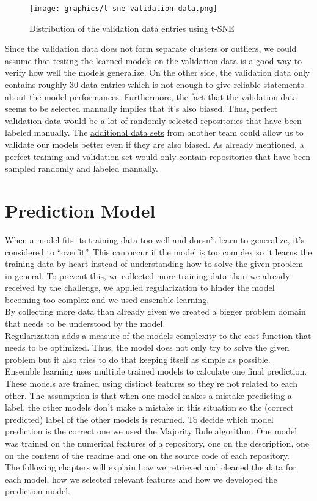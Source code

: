 \documentclass{article}
\begin{document}
\begin{figure}
	\centering
		\texttt{[image: graphics/t-sne-validation-data.png]}
	\caption{Distribution of the validation data entries using t-SNE}
	\label{t-sne-validation-data}
\end{figure}

Since the validation data does not form separate clusters or outliers,
we could assume that testing the learned models on the validation data
is a good way to verify how well the models generalize. On the other
side, the validation data only contains roughly 30 data entries which is
not enough to give reliable statements about the model performances.
Furthermore, the fact that the validation data seems to be selected
manually implies that it's also biased. Thus, perfect validation data
would be a lot of randomly selected repositories that have been labeled
manually. The
\href{https://github.com/InformatiCup/InformatiCup2017/tree/master/additional_data_sets}{additional
data sets} from another team could allow us to validate our models
better even if they are also biased. As already mentioned, a perfect
training and validation set would only contain repositories that have
been sampled randomly and labeled manually.

\section{Prediction Model}\label{prediction-model}

When a model fits its training data too well and doesn't learn to
generalize, it's considered to ``overfit''. This can occur if the model
is too complex so it learns the training data by heart instead of
understanding how to solve the given problem in general. To prevent
this, we collected more training data than we already received by the
challenge, we applied regularization to hinder the model becoming too
complex and we used ensemble learning.\\
By collecting more data than already given we created a bigger problem
domain that needs to be understood by the model.\\
Regularization adds a measure of the models complexity to the cost
function that needs to be optimized. Thus, the model does not only try
to solve the given problem but it also tries to do that keeping itself
as simple as possible.\\
Ensemble learning uses multiple trained models to calculate one final
prediction. These models are trained using distinct features so they're
not related to each other. The assumption is that when one model makes a
mistake predicting a label, the other models don't make a mistake in
this situation so the (correct predicted) label of the other models is
returned. To decide which model prediction is the correct one we used
the Majority Rule algorithm. One model was trained on the numerical
features of a repository, one on the description, one on the content of
the readme and one on the source code of each repository.\\
The following chapters will explain how we retrieved and cleaned the
data for each model, how we selected relevant features and how we
developed the prediction model.
\end{document}
